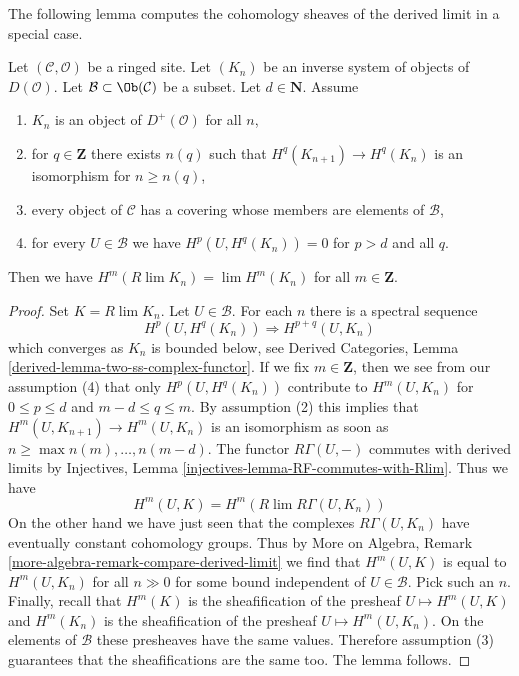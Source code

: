 \noindent
The following lemma computes the cohomology sheaves of the
derived limit in a special case.

\begin{lemma}
\label{lemma-Rlim-of-system}
Let $(\mathcal{C}, \mathcal{O})$ be a ringed site. Let $(K_n)$
be an inverse system of objects of $D(\mathcal{O})$.
Let $\mathcal{B} \subset \Ob(\mathcal{C})$ be a subset.
Let $d \in \mathbf{N}$. Assume
\begin{enumerate}
\item $K_n$ is an object of $D^+(\mathcal{O})$ for all $n$,
\item for $q \in \mathbf{Z}$ there exists
$n(q)$ such that $H^q(K_{n + 1}) \to H^q(K_n)$ is an isomorphism for
$n \geq n(q)$,
\item every object of $\mathcal{C}$ has a covering whose members are
elements of $\mathcal{B}$,
\item for every $U \in \mathcal{B}$ we have $H^p(U, H^q(K_n)) = 0$
for $p > d$ and all $q$.
\end{enumerate}
Then we have $H^m(R\lim K_n) = \lim H^m(K_n)$ for all $m \in \mathbf{Z}$.
\end{lemma}

\begin{proof}
Set $K = R\lim K_n$. Let $U \in \mathcal{B}$. For each $n$ there is a spectral
sequence
$$
H^p(U, H^q(K_n)) \Rightarrow H^{p + q}(U, K_n)
$$
which converges as $K_n$ is bounded below, see
Derived Categories, Lemma \ref{derived-lemma-two-ss-complex-functor}.
If we fix $m \in \mathbf{Z}$, then we see from our assumption (4)
that only $H^p(U, H^q(K_n))$ contribute to $H^m(U, K_n)$
for $0 \leq p \leq d$ and $m - d \leq q \leq m$. By assumption (2)
this implies that $H^m(U, K_{n + 1}) \to H^m(U, K_n)$ is an isomorphism
as soon as $n \geq \max{n(m), \ldots, n(m - d)}$. The functor $R\Gamma(U, -)$
commutes with derived limits by
Injectives, Lemma \ref{injectives-lemma-RF-commutes-with-Rlim}.
Thus we have
$$
H^m(U, K) = H^m(R\lim R\Gamma(U, K_n))
$$
On the other hand we have just seen that the complexes $R\Gamma(U, K_n)$
have eventually constant cohomology groups. Thus by
More on Algebra, Remark \ref{more-algebra-remark-compare-derived-limit}
we find that $H^m(U, K)$ is equal to $H^m(U, K_n)$ for
all $n \gg 0$ for some bound independent of $U \in \mathcal{B}$.
Pick such an $n$. Finally, recall that $H^m(K)$ is the sheafification of
the presheaf $U \mapsto H^m(U, K)$ and $H^m(K_n)$ is the sheafification
of the presheaf $U \mapsto H^m(U, K_n)$. On the elements
of $\mathcal{B}$ these presheaves have the same values. Therefore assumption
(3) guarantees that the sheafifications are the same too.
The lemma follows.
\end{proof}




